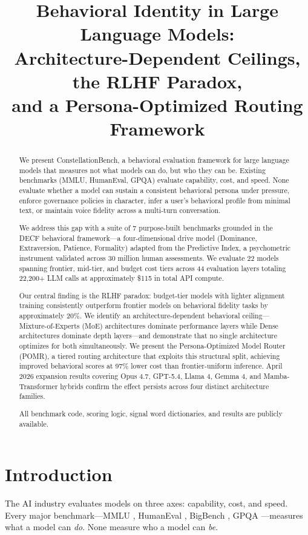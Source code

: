\documentclass[conference]{IEEEtran}
\title{Behavioral Identity in Large Language Models:\\Architecture-Dependent Ceilings, the RLHF Paradox,\\and a Persona-Optimized Routing Framework}
\author{\IEEEauthorblockN{Zachary Holwerda}
\IEEEauthorblockA{Airlock Technologies\\Detroit, MI\\admin@airlocklabs.com}}
\begin{document}
\maketitle

\begin{abstract}
We present ConstellationBench, a behavioral evaluation framework for large language models that measures not what models can do, but who they can be. Existing benchmarks (MMLU, HumanEval, GPQA) evaluate capability, cost, and speed. None evaluate whether a model can sustain a consistent behavioral persona under pressure, enforce governance policies in character, infer a user's behavioral profile from minimal text, or maintain voice fidelity across a multi-turn conversation.

We address this gap with a suite of 7 purpose-built benchmarks grounded in the DECF behavioral framework---a four-dimensional drive model (Dominance, Extraversion, Patience, Formality) adapted from the Predictive Index, a psychometric instrument validated across 30 million human assessments. We evaluate 22 models spanning frontier, mid-tier, and budget cost tiers across 44 evaluation layers totaling 22,200+ LLM calls at approximately \$115 in total API compute.

Our central finding is the RLHF paradox: budget-tier models with lighter alignment training consistently outperform frontier models on behavioral fidelity tasks by approximately 20\%. We identify an architecture-dependent behavioral ceiling---Mixture-of-Experts (MoE) architectures dominate performance layers while Dense architectures dominate depth layers---and demonstrate that no single architecture optimizes for both simultaneously. We present the Persona-Optimized Model Router (POMR), a tiered routing architecture that exploits this structural split, achieving improved behavioral scores at 97\% lower cost than frontier-uniform inference. April 2026 expansion results covering Opus 4.7, GPT-5.4, Llama 4, Gemma 4, and Mamba-Transformer hybrids confirm the effect persists across four distinct architecture families.

All benchmark code, scoring logic, signal word dictionaries, and results are publicly available.
\end{abstract}

\section{Introduction}

The AI industry evaluates models on three axes: capability, cost, and speed. Every major benchmark---MMLU \cite{hendrycks2021}, HumanEval \cite{chen2021}, BigBench \cite{srivastava2022}, GPQA \cite{rein2023}---measures what a model can \textit{do}. None measure who a model can \textit{be}.
\end{document}
